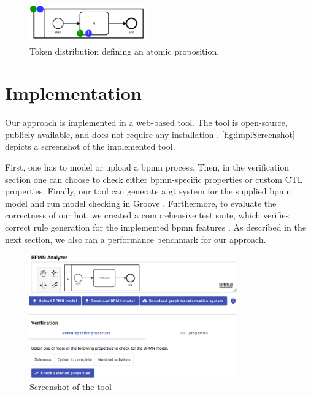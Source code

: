 \documentclass[runningheads]{llncs}
\begin{document}
\begin{figure}[ht]
    \centering
    \includegraphics[width=0.45\textwidth]{images/bpmn_semantics-atomic-proposition.pdf}
    \caption{Token distribution defining an atomic proposition.}
    \label{fig:atomicProposition}
\end{figure}


\section{Implementation} \label{sec:impl}

Our approach is implemented in a web-based tool.
The tool is open-source, publicly available, and does not require any installation \cite{krauterArtifactsICGT2023}.
\autoref{fig:implScreenshot} depicts a screenshot of the implemented tool.

First, one has to model or upload a \gls*{bpmn} process.
Then, in the verification section one can choose to check either \gls*{bpmn}-specific properties or custom CTL properties.
Finally, our tool can generate a \gls*{gt} system for the supplied \gls*{bpmn} model and run model checking in Groove \cite{kastenbergModelCheckingDynamic2006}.
Furthermore, to evaluate the correctness of our \gls*{hot}, we created a comprehensive test suite, which verifies correct rule generation for the implemented \gls*{bpmn} features \cite{krauterArtifactsICGT2023}.
As described in the next section, we also ran a performance benchmark for our approach.

\begin{figure}[ht]
    \centering
    \includegraphics[width=0.8\textwidth]{images/impl_very_short.png}
    \caption{Screenshot of the tool}
    \label{fig:implScreenshot}
\end{figure}
\end{document}
